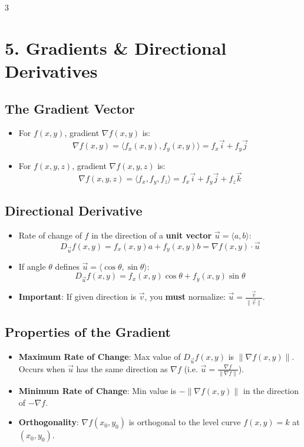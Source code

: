 \documentclass[10pt,landscape,a4paper]{article}
\begin{document}
\begin{multicols*}{3}
\section{5. Gradients \& Directional Derivatives}
\subsection{The Gradient Vector}
\begin{itemize}
    \item For $f(x,y)$, gradient $\nabla f(x,y)$ is:
    \[ \nabla f(x,y) = \langle f_x(x,y), f_y(x,y) \rangle = f_x\vec{i} + f_y\vec{j} \]
    \item For $f(x,y,z)$, gradient $\nabla f(x,y,z)$ is:
    \[ \nabla f(x,y,z) = \langle f_x, f_y, f_z \rangle = f_x\vec{i} + f_y\vec{j} + f_z\vec{k} \]
\end{itemize}

\subsection{Directional Derivative}
\begin{itemize}
    \item Rate of change of $f$ in the direction of a \textbf{unit vector} $\vec{u} = \langle a, b \rangle$:
    \[ D_{\vec{u}}f(x,y) = f_x(x,y)a + f_y(x,y)b = \nabla f(x,y) \cdot \vec{u} \]
    \item If angle $\theta$ defines $\vec{u} = \langle \cos\theta, \sin\theta \rangle$:
    \[ D_{\vec{u}}f(x,y) = f_x(x,y)\cos\theta + f_y(x,y)\sin\theta \]
    \item \textbf{Important}: If given direction is $\vec{v}$, you \textbf{must} normalize: $\vec{u} = \frac{\vec{v}}{\|\vec{v}\|}$.
\end{itemize}

\subsection{Properties of the Gradient}
\begin{itemize}
    \item \textbf{Maximum Rate of Change}: Max value of $D_{\vec{u}}f(x,y)$ is $\|\nabla f(x,y)\|$. Occurs when $\vec{u}$ has the same direction as $\nabla f$ (i.e. $\vec{u} = \frac{\nabla f}{\|\nabla f\|}$).
    \item \textbf{Minimum Rate of Change}: Min value is $-\|\nabla f(x,y)\|$ in the direction of $-\nabla f$.
    \item \textbf{Orthogonality}: $\nabla f(x_0, y_0)$ is orthogonal to the level curve $f(x,y)=k$ at $(x_0,y_0)$.
\end{itemize}


\end{multicols*}
\end{document}

